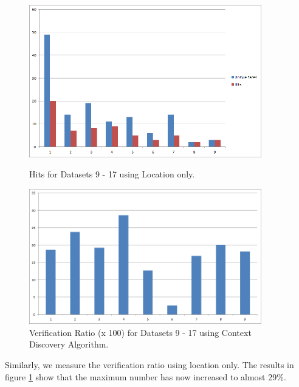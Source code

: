 \begin{figure}[ht]
\begin{minipage}[b]{0.45\linewidth}
\centering
\includegraphics[width=0.9\textwidth]{media/chapter5/loc-unique-faces-hits.png}
\caption{Hits for Datasets 9 - 17 using Location only.}
\label{fig:exp-loc-hits}
\end{minipage}
\hspace{0.5cm}
\begin{minipage}[b]{0.45\linewidth}
\centering
\includegraphics[width=0.9\textwidth]{media/chapter5/loc-verification-ratio.png}
\caption{Verification Ratio (x 100) for Datasets 9 - 17 using Context Discovery Algorithm.}
\label{fig:exp-loc-verification-ratio}
\end{minipage}
\end{figure}

Similarly, we measure the verification ratio using location only. The results in figure \ref{fig:exp-loc-verification-ratio} show that the maximum number has now increased to almost 29\%. 

